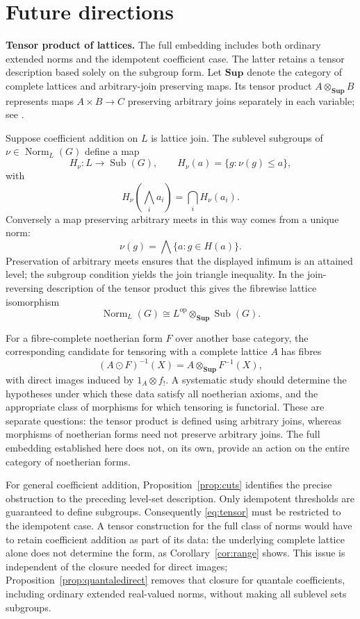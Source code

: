 \documentclass[12pt,a4paper]{amsart}
\theoremstyle{definition}
\newcommand{\Sub}{\operatorname{Sub}}
\newcommand{\op}{\mathrm{op}}
\newcommand{\Norm}{\operatorname{Norm}}
\newcommand{\Sup}{\mathbf{Sup}}
\begin{document}
\section{Future directions}\label{sec:future}

\medskip
\noindent\textbf{Tensor product of lattices.}
The full embedding includes both ordinary extended norms and the idempotent coefficient case. The latter retains a tensor description based solely on the subgroup form. Let $\Sup$ denote the category of complete lattices and arbitrary-join preserving maps. Its tensor product $A\otimes_{\Sup}B$ represents maps $A\times B\to C$ preserving arbitrary joins separately in each variable; see \cite{GHK}.

Suppose coefficient addition on $L$ is lattice join. The sublevel subgroups of $\nu\in\Norm_L(G)$ define a map
\[
                   H_\nu:L\longrightarrow\Sub(G),\qquad
                   H_\nu(a)=\{g:\nu(g)\leq a\},
\]
with
\[
                   H_\nu\left(\bigwedge_i a_i\right)
                         =\bigcap_iH_\nu(a_i).
\]
Conversely a map preserving arbitrary meets in this way comes from a unique norm:
\[
                          \nu(g)=\bigwedge\{a:g\in H(a)\}.
\]
Preservation of arbitrary meets ensures that the displayed infimum is an attained level; the subgroup condition yields the join triangle inequality. In the join-reversing description of the tensor product this gives the fibrewise lattice isomorphism
\begin{equation}\label{eq:tensor}
                    \Norm_L(G)\cong L^{\op}\otimes_{\Sup}\Sub(G).
\end{equation}

For a fibre-complete noetherian form $F$ over another base category, the corresponding candidate for tensoring with a complete lattice $A$ has fibres
\[
                    (A\odot F)^{-1}(X)
                           =A\otimes_{\Sup}F^{-1}(X),
\]
with direct images induced by $1_A\otimes f_!$.
A systematic study should determine the hypotheses under which these data satisfy all noetherian axioms, and the appropriate class of morphisms for which tensoring is functorial. These are separate questions: the tensor product is defined using arbitrary joins, whereas morphisms of noetherian forms need not preserve arbitrary joins. The full embedding established here does not, on its own, provide an action on the entire category of noetherian forms.

For general coefficient addition, Proposition~\ref{prop:cuts} identifies the precise obstruction to the preceding level-set description. Only idempotent thresholds are guaranteed to define subgroups. Consequently \eqref{eq:tensor} must be restricted to the idempotent case. A tensor construction for the full class of norms would have to retain coefficient addition as part of its data: the underlying complete lattice alone does not determine the form, as Corollary~\ref{cor:range} shows. This issue is independent of the closure needed for direct images; Proposition~\ref{prop:quantaledirect} removes that closure for quantale coefficients, including ordinary extended real-valued norms, without making all sublevel sets subgroups.
\end{document}
